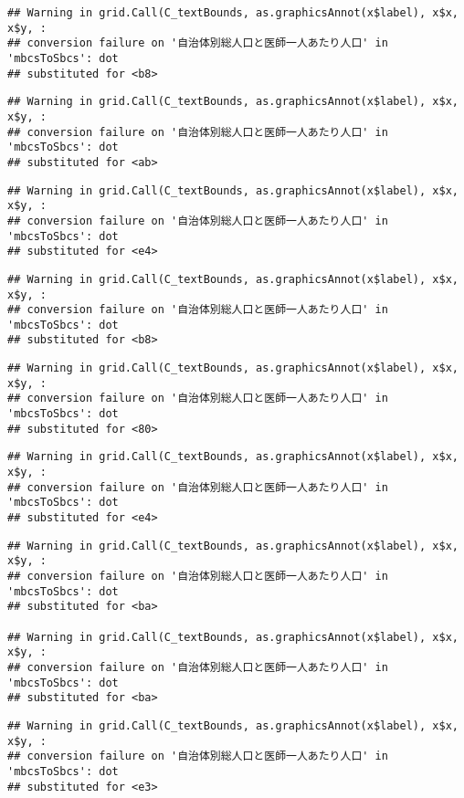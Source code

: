 \documentclass[
]{article}
\begin{document}
\begin{verbatim}
## Warning in grid.Call(C_textBounds, as.graphicsAnnot(x$label), x$x, x$y, :
## conversion failure on '自治体別総人口と医師一人あたり人口' in 'mbcsToSbcs': dot
## substituted for <b8>
\end{verbatim}

\begin{verbatim}
## Warning in grid.Call(C_textBounds, as.graphicsAnnot(x$label), x$x, x$y, :
## conversion failure on '自治体別総人口と医師一人あたり人口' in 'mbcsToSbcs': dot
## substituted for <ab>
\end{verbatim}

\begin{verbatim}
## Warning in grid.Call(C_textBounds, as.graphicsAnnot(x$label), x$x, x$y, :
## conversion failure on '自治体別総人口と医師一人あたり人口' in 'mbcsToSbcs': dot
## substituted for <e4>
\end{verbatim}

\begin{verbatim}
## Warning in grid.Call(C_textBounds, as.graphicsAnnot(x$label), x$x, x$y, :
## conversion failure on '自治体別総人口と医師一人あたり人口' in 'mbcsToSbcs': dot
## substituted for <b8>
\end{verbatim}

\begin{verbatim}
## Warning in grid.Call(C_textBounds, as.graphicsAnnot(x$label), x$x, x$y, :
## conversion failure on '自治体別総人口と医師一人あたり人口' in 'mbcsToSbcs': dot
## substituted for <80>
\end{verbatim}

\begin{verbatim}
## Warning in grid.Call(C_textBounds, as.graphicsAnnot(x$label), x$x, x$y, :
## conversion failure on '自治体別総人口と医師一人あたり人口' in 'mbcsToSbcs': dot
## substituted for <e4>
\end{verbatim}

\begin{verbatim}
## Warning in grid.Call(C_textBounds, as.graphicsAnnot(x$label), x$x, x$y, :
## conversion failure on '自治体別総人口と医師一人あたり人口' in 'mbcsToSbcs': dot
## substituted for <ba>

## Warning in grid.Call(C_textBounds, as.graphicsAnnot(x$label), x$x, x$y, :
## conversion failure on '自治体別総人口と医師一人あたり人口' in 'mbcsToSbcs': dot
## substituted for <ba>
\end{verbatim}

\begin{verbatim}
## Warning in grid.Call(C_textBounds, as.graphicsAnnot(x$label), x$x, x$y, :
## conversion failure on '自治体別総人口と医師一人あたり人口' in 'mbcsToSbcs': dot
## substituted for <e3>
\end{verbatim}
\end{document}
